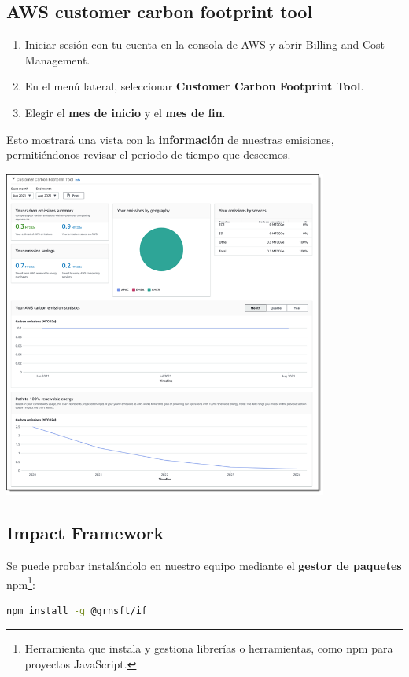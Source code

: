 \documentclass[12pt,a4paper]{report}
\begin{document}
\subsection{AWS customer carbon footprint tool}
\begin{enumerate}
  \item Iniciar sesión con tu cuenta en la consola de AWS y abrir Billing and Cost
        Management.
  \item En el menú lateral, seleccionar \textbf{Customer Carbon Footprint Tool}.
  \item Elegir el \textbf{mes de inicio} y el \textbf{mes de fin}.
\end{enumerate}
Esto mostrará una vista con la \textbf{información} de nuestras emisiones, permitiéndonos revisar el periodo de tiempo que deseemos.
\begin{center}
  \includegraphics[width=0.8\textwidth]{imagenes/AWS_1.png}
\end{center}

\subsection{Impact Framework}
Se puede probar instalándolo en nuestro equipo mediante el \textbf{gestor de
  paquetes} npm\footnote{Herramienta que instala y gestiona librerías o
  herramientas, como npm para proyectos JavaScript.}:

\begin{tcolorbox}[colback=codebackground, colframe=codeborder, boxrule=0.8pt, arc=0mm, boxsep=5pt, left=5pt, right=5pt, top=5pt, bottom=5pt]
  \begin{lstlisting}[language=bash]
  npm install -g @grnsft/if
  \end{lstlisting}
\end{tcolorbox}
\end{document}
